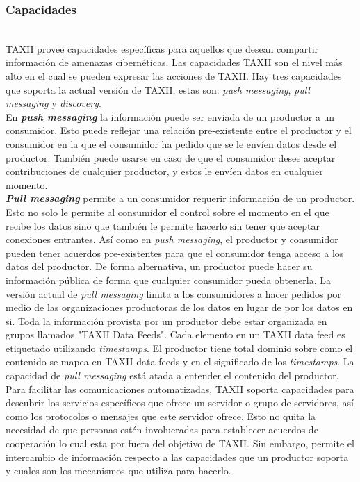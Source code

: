 \newpage
\subsubsection{Capacidades}\ \\

TAXII provee capacidades específicas para aquellos que desean compartir 
información de amenazas cibernéticas. Las capacidades TAXII son el nivel más 
alto en el cual se pueden expresar las acciones de TAXII. Hay tres capacidades 
que soporta la actual versión de TAXII, estas son: \textit{push messaging}, \textit{pull 
messaging} y \textit{discovery}.\\

En \textit{\textbf{push messaging}} la información puede ser enviada de un productor a un 
consumidor. Esto puede reflejar una relación pre-existente entre el productor y 
el consumidor en la que el consumidor ha pedido que se le envíen datos desde el 
productor. También puede usarse en caso de que el consumidor desee aceptar 
contribuciones de cualquier productor, y estos le envíen datos en cualquier 
momento.\\

\textit{\textbf{Pull messaging}} permite a un consumidor requerir información de un productor. 
Esto no solo le permite al consumidor el control sobre el momento en el que 
recibe los datos sino que también le permite hacerlo sin tener que aceptar 
conexiones entrantes. Así como en \textit{push messaging}, el productor y consumidor 
pueden tener acuerdos pre-existentes para que el consumidor tenga acceso a los 
datos del productor. De forma alternativa, un productor puede hacer su 
información pública de forma que cualquier consumidor pueda obtenerla. La 
versión actual de \textit{pull messaging} limita a los consumidores a hacer pedidos por 
medio de las organizaciones productoras de los datos en lugar de por los datos 
en si. Toda la información provista por un productor debe estar organizada en 
grupos llamados "TAXII Data Feeds". Cada elemento en un TAXII data feed es 
etiquetado utilizando \textit{timestamps}. El productor tiene total dominio sobre como el 
contenido se mapea en TAXII data feeds y en el significado de los \textit{timestamps}. La 
capacidad de \textit{pull messaging} está atada a entender el contenido del productor.\\

Para facilitar las comunicaciones automatizadas, TAXII soporta capacidades para 
descubrir los servicios específicos que ofrece un servidor o grupo de 
servidores, así como los protocolos o mensajes que este servidor ofrece. Esto no 
quita la necesidad de que personas estén involucradas para establecer acuerdos de 
cooperación lo cual esta por fuera del objetivo de TAXII. Sin embargo, permite 
el intercambio de información respecto a las capacidades que un productor 
soporta y cuales son los mecanismos que utiliza para hacerlo.

